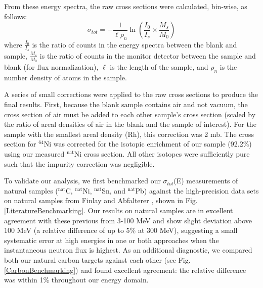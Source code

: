 \documentclass[twocolumn,secnumarabic,amssymb, nobibnotes, aps, prl,
superscriptaddress, nobalancelastpage]{revtex4}
\newcommand{\tot}{\ensuremath{\sigma_{tot}}}
\newcommand{\totEs}{\ensuremath{\sigma_{tot}}(E)\,\,}
\begin{document}
From these energy spectra, the raw cross sections were calculated, bin-wise, as follows:
$$
\tot = -\frac{1}{\ell\rho_{n}}
\ln \left(\frac{I_{0}}{I_{s}}\times\frac{M_{s}}{M_{0}}\right)
$$
where $\frac{I_{0}}{I_{s}}$ is the ratio of counts in the energy spectra between 
the blank and sample, $\frac{M_{s}}{M_{0}}$ is the ratio of counts in the
monitor detector between the sample and blank (for flux normalization), $\ell$ is the length 
of the sample, and $\rho_{n}$ is the number density of atoms in the sample.

A series of small corrections were applied to the raw cross sections to produce
the final results. First, because the blank sample contains air and not vacuum,
the cross section of air must be added to each other sample's cross section (scaled by  
the ratio of areal densities of air in the blank and the sample of interest).
For the sample with the smallest areal density (Rh), this correction was 2 mb.
The cross section for $^{64}$Ni was corrected for the isotopic enrichment of our
sample (92.2\%) using our measured $^{\text{nat}}$Ni cross section. All other isotopes were 
sufficiently pure such that the impurity correction was negligible.

To validate our analysis, we first benchmarked our \totEs measurements of natural samples
($^{\text{nat}}$C, $^{\text{nat}}$Ni, $^{\text{nat}}$Sn, and
$^{\text{nat}}$Pb) against the high-precision data sets on natural samples from Finlay
\cite{Finlay1993} and Abfalterer \cite{Abfalterer2001}, shown in Fig.
\ref{LiteratureBenchmarking}. Our results on natural samples are in excellent agreement with 
these previous from 3-100 MeV and show slight deviation above 100 MeV (a
relative difference of up to 5\% at 300 MeV), suggesting a small systematic
error at high energies in one or both approaches when the instantaneous neutron
flux is highest. As an additional diagnostic, we compared 
both our natural carbon targets against each other (see Fig.
\ref{CarbonBenchmarking}) and found excellent agreement: the relative difference
was within 1\% throughout our energy domain.
\end{document}
